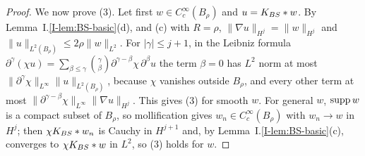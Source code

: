 \begin{proof}
We now prove (3). Let first $w\in C_c^\infty(B_\rho)$ and $u=K_{BS}\ast w$. By
Lemma~I.\ref{I-lem:BS-basic}(d), and (c) with $R=\rho$,
$\|\nabla u\|_{H^j}=\|w\|_{H^j}$ and $\|u\|_{L^2(B_\rho)}\le2\rho\|w\|_{L^2}$.
For $|\gamma|\le j+1$, in the Leibniz formula
$\partial^\gamma(\chi u)=\sum_{\beta\le\gamma}\binom\gamma\beta\partial^{\gamma-\beta}\chi\,\partial^\beta u$
the term $\beta=0$ has $L^2$ norm at most
$\|\partial^\gamma\chi\|_{L^\infty}\|u\|_{L^2(B_\rho)}$, because $\chi$ vanishes
outside $B_\rho$, and every other term at most
$\|\partial^{\gamma-\beta}\chi\|_{L^\infty}\|\nabla u\|_{H^j}$. This gives (3) for
smooth $w$. For general $w$, $\operatorname{supp} w$ is a compact subset of $B_\rho$, so
mollification gives $w_n\in C_c^\infty(B_\rho)$ with $w_n\to w$ in $H^j$; then
$\chi K_{BS}\ast w_n$ is Cauchy in $H^{j+1}$ and, by Lemma~I.\ref{I-lem:BS-basic}(c),
converges to $\chi K_{BS}\ast w$ in $L^2$, so (3) holds for $w$.
\end{proof}
